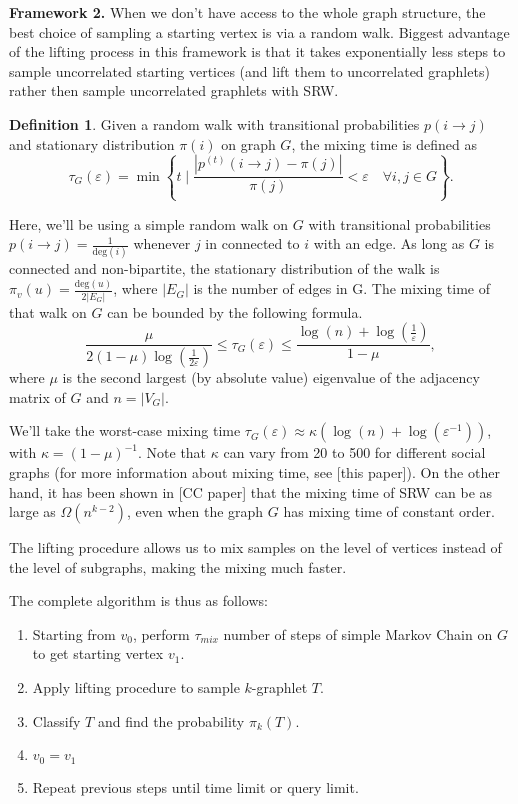 \documentclass[11pt]{article}
\def\deg{\mathrm{deg}}
\theoremstyle{remark}
\theoremstyle{definition}
\newtheorem{definition}{Definition}
\begin{document}
	\vskip 10pt
	\noindent
	\textbf{Framework 2.} When we don't have access to the whole graph structure, the best 
	choice of sampling a starting vertex is via a random walk.
	Biggest advantage of the lifting process in this framework is that it takes exponentially 
	less steps to sample uncorrelated starting vertices (and lift them to uncorrelated 
	graphlets) rather then sample uncorrelated graphlets with SRW.
	\begin{definition}
		Given a random walk with transitional probabilities $p(i\rightarrow j)$ and 
		stationary distribution $\pi(i)$ on graph $G$, the mixing time is defined as
		\begin{equation*}
			\tau_G(\varepsilon) = 
			\min\left\{t \mid 
			\frac{\left\vert p^{(t)}(i\rightarrow j) - \pi(j)\right\vert}{\pi(j)}
			<\varepsilon \quad \forall i,j\in G\right\}.
		\end{equation*}
	\end{definition}
	
	Here, we'll be using a simple random walk on $G$ with transitional probabilities 
	$p(i\rightarrow j) = \frac{1}{\deg(i)}$ whenever $j$ in connected to $i$ with an edge.
	As long as $G$ is connected and non-bipartite, the stationary distribution of the walk is 
	$\pi_v(u) = \frac{\deg(u)}{2|E_G|}$, where $|E_G|$ is the number of edges in G.
	The mixing time of that walk on $G$ can be bounded by the following formula.
	\begin{equation*}
		\frac{\mu}{2(1-\mu) \log(\frac{1}{2\varepsilon})} \leq
		\tau_G(\varepsilon) \leq
		\frac{\log(n) + \log(\frac{1}{\varepsilon})}{1-\mu},
	\end{equation*}
	where $\mu$ is the second largest (by absolute value) eigenvalue of the adjacency matrix 
	of $G$ and $n = |V_G|$.
	
	We'll take the worst-case mixing time 
	$\tau_G(\varepsilon) \approx \kappa(\log(n)+\log(\varepsilon^{-1}))$, 
	with $\kappa  = (1-\mu)^{-1}$.
	Note that $\kappa$ can vary from 20 to 500 for different social graphs (for more 
	information about mixing time, see [this paper]).
	On the other hand, it has been shown in [CC paper] that the mixing time of SRW can be as 
	large as $\Omega(n^{k-2})$, even when the graph $G$ has mixing time of constant order.
	
	The lifting procedure allows us to mix samples on the level of vertices instead of the level 
	of subgraphs, making the mixing much faster.
	
	The complete algorithm is thus as follows:
	\begin{enumerate}
		\item Starting from $v_0$, perform $\tau_{mix}$ number of steps of simple Markov 
		Chain 	on $G$ to get starting vertex $v_1$.
		\item Apply lifting procedure to sample $k$-graphlet $T$.
		\item Classify $T$ and find the probability $\pi_k(T)$.
		\item $v_0 = v_1$
		\item Repeat previous steps until time limit or query limit.
	\end{enumerate}
	
\end{document}
